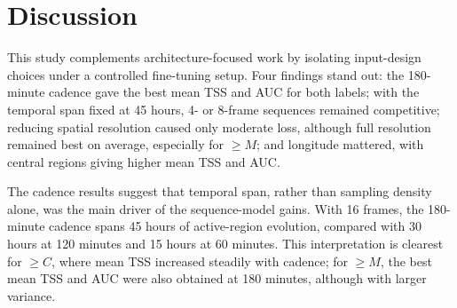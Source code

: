 \documentclass[runningheads]{llncs}
\begin{document}



\section{Discussion}

This study complements architecture-focused work by isolating input-design choices under a controlled fine-tuning setup. Four findings stand out: the 180-minute cadence gave the best mean TSS and AUC for both labels; with the temporal span fixed at 45 hours, 4- or 8-frame sequences remained competitive; reducing spatial resolution caused only moderate loss, although full resolution remained best on average, especially for $\geq M$; and longitude mattered, with central regions giving higher mean TSS and AUC.

The cadence results suggest that temporal span, rather than sampling density alone, was the main driver of the sequence-model gains. With 16 frames, the 180-minute cadence spans 45 hours of active-region evolution, compared with 30 hours at 120 minutes and 15 hours at 60 minutes. This interpretation is clearest for $\geq C$, where mean TSS increased steadily with cadence; for $\geq M$, the best mean TSS and AUC were also obtained at 180 minutes, although with larger variance.
\end{document}
